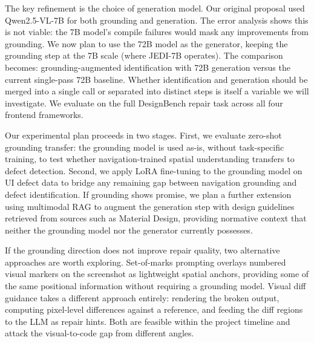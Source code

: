 \documentclass[11pt]{article}
\begin{document}
The key refinement is the choice of generation model. Our original
proposal used Qwen2.5-VL-7B for both grounding and generation. The
error analysis shows this is not viable: the 7B model's compile failures
would mask any improvements from grounding. We now plan to use the 72B
model as the generator, keeping the grounding step at the 7B scale
(where JEDI-7B operates). The comparison becomes: grounding-augmented
identification with 72B generation versus the current single-pass 72B
baseline. Whether identification and generation should be merged into a
single call or separated into distinct steps is itself a variable we
will investigate. We evaluate on the full DesignBench repair task across
all four frontend frameworks.

Our experimental plan proceeds in two stages. First, we evaluate
zero-shot grounding transfer: the grounding model is used as-is, without
task-specific training, to test whether navigation-trained spatial
understanding transfers to defect detection. Second, we apply LoRA
fine-tuning to the grounding model on UI defect data to bridge any
remaining gap between navigation grounding and defect identification. If
grounding shows promise, we plan a further extension using multimodal
RAG to augment the generation step with design guidelines retrieved from
sources such as Material Design, providing normative context that
neither the grounding model nor the generator currently possesses.

If the grounding direction does not improve repair quality, two
alternative approaches are worth exploring. Set-of-marks prompting
overlays numbered visual markers on the screenshot as lightweight
spatial anchors, providing some of the same positional information
without requiring a grounding model. Visual diff guidance takes a
different approach entirely: rendering the broken output, computing
pixel-level differences against a reference, and feeding the diff
regions to the LLM as repair hints. Both are feasible within the project
timeline and attack the visual-to-code gap from different angles.



\end{document}
